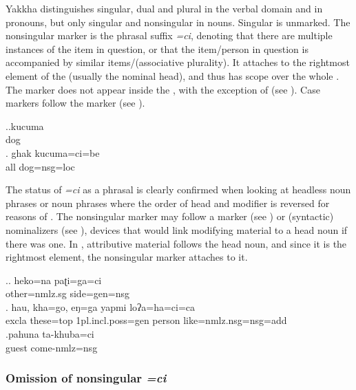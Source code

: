Yakkha distinguishes singular, dual and plural in the verbal domain and in pronouns, but only singular and nonsingular in nouns. Singular  is unmarked. The nonsingular marker is the phrasal suffix \emph{=ci}, denoting that there are multiple instances of the item in question, or that the item/person in question is accompanied by similar items/(associative plurality). It attaches to the rightmost element of the  (usually the nominal head), and thus has scope over the whole . The marker does not appear inside the , with the exception of  (see ). Case markers follow the  marker (see \Next). 

\ex.\ag.kucuma\\
dog\\
\bg. ghak kucuma=ci=be\\
all dog{\sc =nsg=loc}\\

The status of \emph{=ci} as a phrasal  is clearly confirmed when looking at headless noun phrases or noun phrases where the order of head and modifier is reversed for reasons  of . The nonsingular marker may follow a  marker (see \Next[a]) or (syntactic) nominalizers (see \Next[b]), devices that would link modifying material to a head noun if there was one. In \Next[c], attributive material follows the head noun, and since it is the rightmost element, the nonsingular marker attaches to it.

\ex.\ag. heko=na         paʈi=ga=ci\\
other{\sc =nmlz.sg} side{\sc =gen=nsg}\\
  
\bg. hau,  kha=go,      eŋ=ga              yapmi  loʔa=ha=ci=ca\\
  {\sc excla} these{\sc =top} {\sc 1pl.incl.poss=gen} person like{\sc =nmlz.nsg=nsg=add}\\
    
 \bg.pahuna ta-khuba=ci\\
guest come{\sc -nmlz=nsg}\\
  
 
\subsubsection{Omission of nonsingular \emph{=ci}}\label{number-1}

